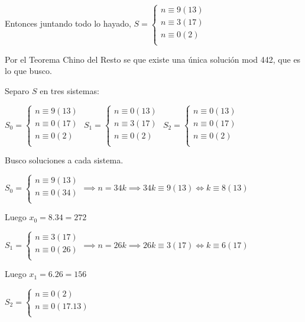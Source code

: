 Entonces juntando todo lo hayado, $S = \begin{cases}
    n \equiv 9(13) \\
    n \equiv 3(17) \\
    n \equiv 0(2) \\
\end{cases} $

Por el Teorema Chino del Resto se que existe una única solución mod 442, que es lo que busco.

Separo $ S $ en tres sistemas:

$ S_0 = \begin{cases}
    n \equiv 9(13) \\
    n \equiv 0(17) \\
    n \equiv 0(2) \\
\end{cases} $
$ S_1 = \begin{cases}
    n \equiv 0(13) \\
    n \equiv 3(17) \\
    n \equiv 0(2) \\
\end{cases} $
$ S_2 = \begin{cases}
    n \equiv 0(13) \\
    n \equiv 0(17) \\
    n \equiv 0(2) \\
\end{cases} $

Busco soluciones a cada sistema.

$ S_0 = \begin{cases}
    n \equiv 9(13) \\
    n \equiv 0(34) \\
\end{cases} \implies n = 34k \implies 34k \equiv 9(13) \iff k \equiv 8 (13) $

Luego $ x_0 = 8.34 = 272 $

$ S_1 = \begin{cases}
    n \equiv 3(17) \\
    n \equiv 0(26) \\
\end{cases} \implies n = 26k \implies 26k \equiv 3(17) \iff k \equiv 6 (17) $

Luego $ x_1 = 6.26 = 156 $

$ S_2 = \begin{cases}
    n \equiv 0(2) \\
    n \equiv 0(17.13) \\
\end{cases} $

